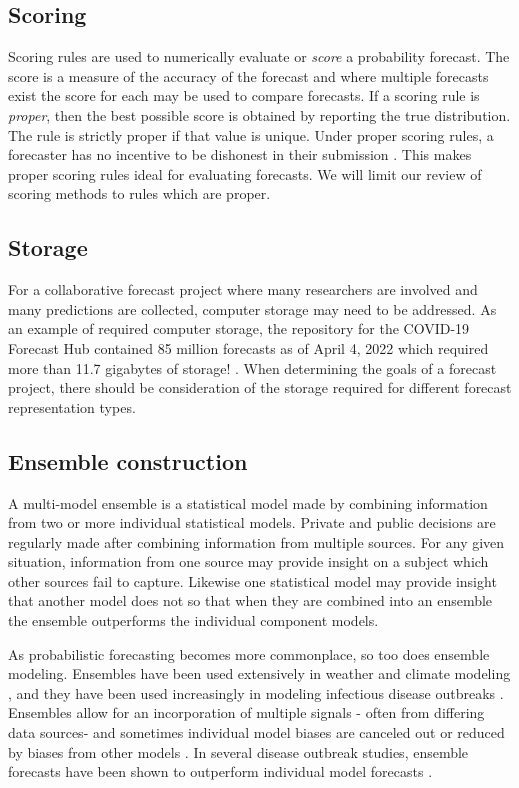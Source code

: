 \documentclass[11pt,notitlepage]{isuthesis}
\begin{document}
\subsection{Scoring}
Scoring rules are used to numerically evaluate or \emph{score} a probability 
forecast. 
The
score is a measure of the accuracy of the forecast and where multiple forecasts
exist the score for each may be used to compare forecasts. If a scoring rule 
is \emph{proper}, then the best possible score is obtained by reporting the true 
distribution. The rule is strictly proper if that value is unique. 
Under proper
scoring rules, a forecaster has no incentive to be dishonest in their 
submission \cite[]{gneiting2007strictly}. This makes proper scoring rules ideal
for evaluating forecasts. We will limit our review of scoring methods to rules
which are proper.

\subsection{Storage}
For a collaborative forecast project where many researchers are involved and 
many predictions are collected, computer storage may need to be addressed. 
As an example of required computer storage, the 
repository for the
COVID-19 Forecast Hub contained 85 million forecasts as of 
April 4, 2022 which required more than 11.7 gigabytes of storage!
\cite[]{covidgithub}.
When determining the goals of a forecast project, there should be consideration 
of the storage required for different forecast representation types.

\subsection{Ensemble construction}
A multi-model ensemble is a statistical model made by combining information from
two or more individual statistical models. Private and public decisions are 
regularly made after combining information from multiple sources. For any given
situation, information from one source may provide insight on a subject which 
other
sources fail to capture. Likewise one statistical model may provide insight
that another model does not so that when they are combined into an ensemble the 
ensemble outperforms the individual component models.

As probabilistic forecasting becomes more commonplace, so too does ensemble 
modeling. Ensembles have been used extensively in weather and
climate modeling \cite[]{baran2018combining}, 
and they have been used increasingly in modeling infectious disease outbreaks
\cite[]{yamana2016superensemble}. 
Ensembles allow for an incorporation of multiple signals -
often from differing data sources- and sometimes individual model biases are 
canceled
out or reduced by biases from other models \cite[see references
therein]{reich2019accuracy}. 
In several disease outbreak studies, ensemble forecasts have been 
shown to outperform individual model forecasts
\cite[see
references therein]{ray2020ensemble, cramer2021evaluation}.
\end{document}
